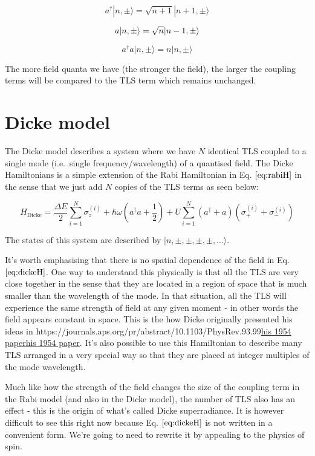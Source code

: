\documentclass[
]{article}
\let\oldhref\href
\renewcommand{\href}[2]{\ifx#1\urlprefix\oldhref{#1}{#2}\else\uline{\oldhref{#1}{#2}}\fi}
\renewcommand{\[}{\begin{equation}}
\renewcommand{\]}{\end{equation}}
\begin{document}
\[
a^{\dagger} |n,\pm\rangle = \sqrt{n+1}|n+1,\pm\rangle
\label{eq:fieldcreate}
\]

\[
a |n,\pm\rangle = \sqrt{n}|n-1,\pm\rangle \\
\label{eq:fielddestroy}
\]

\[
a^{\dagger}a |n,\pm\rangle = n|n,\pm\rangle
\]

The more field quanta we have (the stronger the field), the larger the
coupling terms will be compared to the TLS term which remains unchanged.

\section{Dicke model}\label{dicke-model}

The Dicke model describes a system where we have \(N\) identical TLS
coupled to a single mode (i.e.~single frequency/wavelength) of a
quantised field. The Dicke Hamiltonians is a simple extension of the
Rabi Hamiltonian in Eq. \(\ref{eq:rabiH}\) in the sense that we just add
\(N\) copies of the TLS terms as seen below:

\[
H_{\text{Dicke}} = \frac{\Delta E}{2} \sum_{i=1}^N \sigma_z^{(i)} +  \hbar\omega\left(a^{\dagger}a +\frac{1}{2}\right) + U \sum_{i=1}^N (a^\dagger + a) (\sigma_+^{(i)} + \sigma_-^{(i)})
\label{eq:dickeH}
\]

The states of this system are described by
\(|n, \pm, \pm, \pm, \pm, ... \rangle\).

It's worth emphasising that there is no spatial dependence of the field
in Eq. \(\ref{eq:dickeH}\). One way to understand this physically is
that all the TLS are very close together in the sense that they are
located in a region of space that is much smaller than the wavelength of
the mode. In that situation, all the TLS will experience the same
strength of field at any given moment - in other words the field appears
constant in space. This is the how Dicke originally presented his ideas
in \href{https://journals.aps.org/pr/abstract/10.1103/PhysRev.93.99}{his
1954 paper}. It's also possible to use this Hamiltonian to describe many
TLS arranged in a very special way so that they are placed at integer
multiples of the mode wavelength.

Much like how the strength of the field changes the size of the coupling
term in the Rabi model (and also in the Dicke model), the number of TLS
also has an effect - this is the origin of what's called Dicke
superradiance. It is however difficult to see this right now because Eq.
\(\ref{eq:dickeH}\) is not written in a convenient form. We're going to
need to rewrite it by appealing to the physics of spin.
\end{document}
